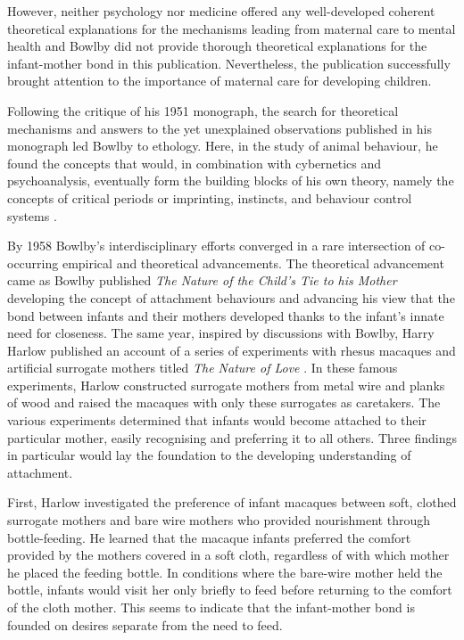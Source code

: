 \documentclass[12pt]{report}
\begin{document}
However, neither psychology nor medicine offered any well-developed coherent theoretical explanations for the mechanisms leading from maternal care to mental health \cite{Bowlby1988, who1962deprivation} and Bowlby did not provide thorough theoretical explanations for the infant-mother bond in this publication.
Nevertheless, the publication successfully brought attention to the importance of maternal care for developing children.

Following the critique of his 1951 monograph, the search for theoretical mechanisms and answers to the yet unexplained observations published in his monograph led Bowlby to ethology.
Here, in the study of animal behaviour, he found the concepts that would, in combination with cybernetics and psychoanalysis, eventually form the building blocks of his own theory, namely the concepts of critical periods or imprinting, instincts, and behaviour control systems \cite{Bowlby1988,bowlby1953critical}.

By 1958 Bowlby's interdisciplinary efforts converged in a rare intersection of co-occurring empirical and theoretical advancements. The theoretical advancement came as Bowlby published \textit{The Nature of the Child's Tie to his Mother} \cite{Bowlby1958} developing the concept of attachment behaviours and advancing his view that the bond between infants and their mothers developed thanks to the infant's innate need for closeness.
The same year, inspired by discussions with Bowlby, Harry Harlow published an account of a series of experiments with rhesus macaques and artificial surrogate mothers titled \textit{The Nature of Love} \cite{Harlow1958}.
In these famous experiments, Harlow constructed surrogate mothers from metal wire and planks of wood and raised the macaques with only these surrogates as caretakers. The various experiments determined that infants would become attached to their particular mother, easily recognising and preferring it to all others.
Three findings in particular would lay the foundation to the developing understanding of attachment.

First, Harlow investigated the preference of infant macaques between soft, clothed surrogate mothers and bare wire mothers who provided nourishment through bottle-feeding.
He learned that the macaque infants preferred the comfort provided by the mothers covered in a soft cloth, regardless of with which mother he placed the feeding bottle.
In conditions where the bare-wire mother held the bottle, infants would visit her only briefly to feed before returning to the comfort of the cloth mother.
This seems to indicate that the infant-mother bond is founded on desires separate from the need to feed.
\end{document}
